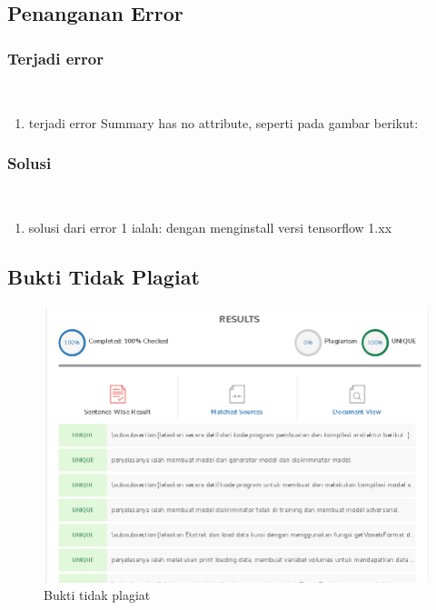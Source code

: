 \subsection{Penanganan Error}
\subsubsection{Terjadi error}
\hfill\\
\begin{enumerate}
\item terjadi error Summary has no attribute, seperti pada gambar berikut:
\end{enumerate}

\subsubsection{Solusi}
\hfill\\
\begin{enumerate}
\item solusi dari error 1 ialah:
dengan menginstall versi tensorflow 1.xx

\end{enumerate}

\subsection{Bukti Tidak Plagiat}
\begin{figure}[H]
	\centering
	\includegraphics[width=12cm]{figures/1174070/8/plagiat.png}
	\caption{Bukti tidak plagiat}
\end{figure}

